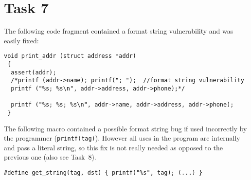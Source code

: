 \section*{Task 7}
The following code fragment contained a format string vulnerability and was easily fixed:
\begin{lstlisting}
void print_addr (struct address *addr)
 {
  assert(addr);
  /*printf (addr->name); printf("; ");  //format string vulnerability
  printf ("%s; %s\n", addr->address, addr->phone);*/
  
  printf ("%s; %s; %s\n", addr->name, addr->address, addr->phone);
 }
\end{lstlisting}

The following macro contained a possible format string bug if used incorrectly by the programmer (\verb|printf(tag)|). However all uses in the program are internally and pass a literal string, so this fix is not really needed as opposed to the previous one (also see Task~8).
\begin{lstlisting}
#define get_string(tag, dst) { printf("%s", tag); (...) }
\end{lstlisting}



